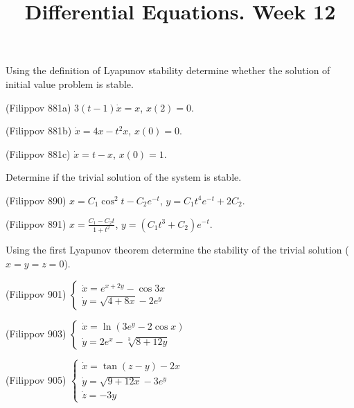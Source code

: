 \documentclass[14pt]{exam}
\title{Differential Equations. Week 12}
\date{}
\begin{document}
	\maketitle
	
	Using the definition of Lyapunov stability determine whether the solution of initial value problem is stable.
	
	\begin{questions}
		\question
		(Filippov 881a)
		$3(t - 1)\dot{x} = x$, $x(2) = 0$.
		
		\question
		(Filippov 881b)
		$\dot{x} = 4x - t^2x$, $x(0) = 0$.
		
		\question
		(Filippov 881c)
		$\dot{x} = t - x$, $x(0) = 1$.
	\end{questions}
	
	Determine if the trivial solution of the system is stable.
	
	\begin{questions}
		\setcounter{question}{3}
		\question
		(Filippov 890)
		$x = C_1\cos^2t - C_2e^{-t}$, $y = C_1t^4e^{-t} + 2C_2$.
		
		\question
		(Filippov 891)
		$x = \frac{C_1 - C_2 t}{1 + t^2}$, $y = (C_1t^3 + C_2)e^{-t}$.
	\end{questions}
	
	Using the first Lyapunov theorem determine the stability of the trivial solution ($x = y = z = 0$).
	
	\begin{questions}
		\setcounter{question}{5}
		\question
		(Filippov 901)
		$\begin{cases}
			\dot{x} = e^{x+2y} - \cos{3x}\\
			\dot{y} = \sqrt{4+8x} - 2 e^y
		\end{cases}$
		
		\question
		(Filippov 903)
		$\begin{cases}
			\dot{x} = \ln({3e^y - 2\cos x})\\
			\dot{y} = 2e^x - \sqrt[3]{8 + 12y}
		\end{cases}$
		
		\question
		(Filippov 905)
		$\begin{cases}
			\dot{x} = \tan(z - y) - 2x\\
			\dot{y} = \sqrt{9+12x} - 3e^y\\
			\dot{z} = -3y
		\end{cases}$
	\end{questions}
	
\end{document}
